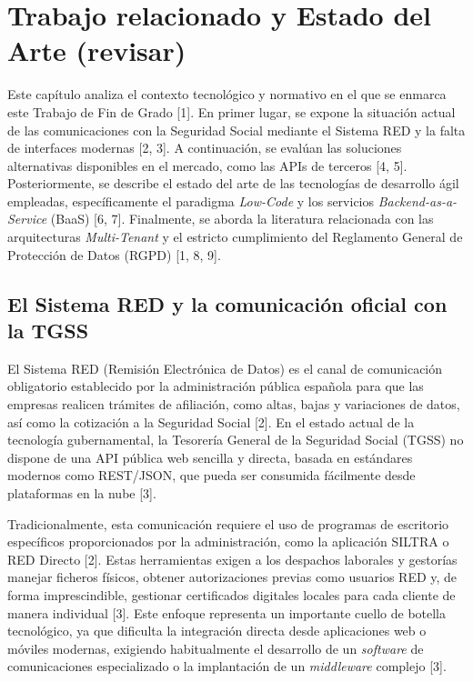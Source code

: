 \chapter{Trabajo relacionado y Estado del Arte (revisar)} \label{chp:state-of-the-art}

Este capítulo analiza el contexto tecnológico y normativo en el que se enmarca este Trabajo de Fin de Grado \cite{primera_entrega} [1]. En primer lugar, se expone la situación actual de las comunicaciones con la Seguridad Social mediante el Sistema RED y la falta de interfaces modernas \cite{blog_diario} [2, 3]. A continuación, se evalúan las soluciones alternativas disponibles en el mercado, como las APIs de terceros \cite{blog_diario} [4, 5]. Posteriormente, se describe el estado del arte de las tecnologías de desarrollo ágil empleadas, específicamente el paradigma \textit{Low-Code} y los servicios \textit{Backend-as-a-Service} (BaaS) \cite{documento_diseno, proyecto_alta} [6, 7]. Finalmente, se aborda la literatura relacionada con las arquitecturas \textit{Multi-Tenant} y el estricto cumplimiento del Reglamento General de Protección de Datos (RGPD) \cite{primera_entrega, proyecto_alta} [1, 8, 9].


\section{El Sistema RED y la comunicación oficial con la TGSS} \label{sct:state:sistema_red}

El Sistema RED (Remisión Electrónica de Datos) es el canal de comunicación obligatorio establecido por la administración pública española para que las empresas realicen trámites de afiliación, como altas, bajas y variaciones de datos, así como la cotización a la Seguridad Social \cite{blog_diario} [2]. En el estado actual de la tecnología gubernamental, la Tesorería General de la Seguridad Social (TGSS) no dispone de una API pública web sencilla y directa, basada en estándares modernos como REST/JSON, que pueda ser consumida fácilmente desde plataformas en la nube \cite{blog_diario} [3].

Tradicionalmente, esta comunicación requiere el uso de programas de escritorio específicos proporcionados por la administración, como la aplicación SILTRA o RED Directo \cite{blog_diario} [2]. Estas herramientas exigen a los despachos laborales y gestorías manejar ficheros físicos, obtener autorizaciones previas como usuarios RED y, de forma imprescindible, gestionar certificados digitales locales para cada cliente de manera individual \cite{blog_diario} [3]. Este enfoque representa un importante cuello de botella tecnológico, ya que dificulta la integración directa desde aplicaciones web o móviles modernas, exigiendo habitualmente el desarrollo de un \textit{software} de comunicaciones especializado o la implantación de un \textit{middleware} complejo \cite{blog_diario} [3].

